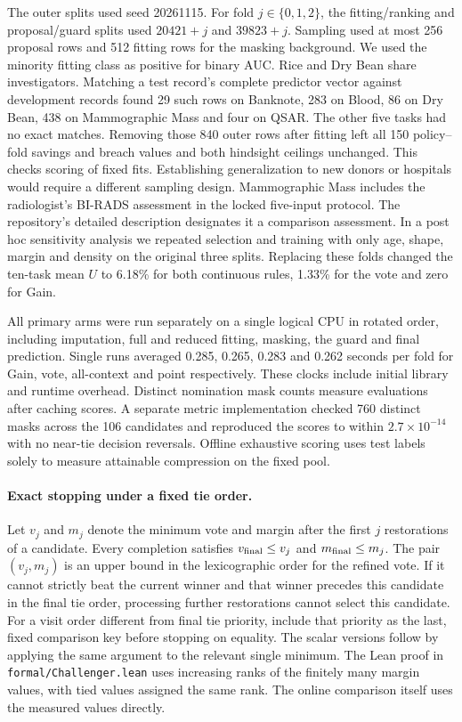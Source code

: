 The outer splits used seed 20261115. For fold $j\in\{0,1,2\}$, the fitting/ranking and proposal/guard splits used $20421+j$ and $39823+j$. Sampling used at most 256 proposal rows and 512 fitting rows for the masking background. We used the minority fitting class as positive for binary AUC. Rice and Dry Bean share investigators. Matching a test record's complete predictor vector against development records found 29 such rows on Banknote, 283 on Blood, 86 on Dry Bean, 438 on Mammographic Mass and four on QSAR. The other five tasks had no exact matches. Removing those 840 outer rows after fitting left all 150 policy--fold savings and breach values and both hindsight ceilings unchanged. This checks scoring of fixed fits. Establishing generalization to new donors or hospitals would require a different sampling design. Mammographic Mass includes the radiologist's BI-RADS assessment in the locked five-input protocol. The repository's detailed description designates it a comparison assessment. In a post hoc sensitivity analysis we repeated selection and training with only age, shape, margin and density on the original three splits. Replacing these folds changed the ten-task mean $U$ to 6.18\% for both continuous rules, 1.33\% for the vote and zero for Gain.

All primary arms were run separately on a single logical CPU in rotated order, including imputation, full and reduced fitting, masking, the guard and final prediction. Single runs averaged 0.285, 0.265, 0.283 and 0.262 seconds per fold for Gain, vote, all-context and point respectively. These clocks include initial library and runtime overhead. Distinct nomination mask counts measure evaluations after caching scores. A separate metric implementation checked 760 distinct masks across the 106 candidates and reproduced the scores to within $2.7\times10^{-14}$ with no near-tie decision reversals. Offline exhaustive scoring uses test labels solely to measure attainable compression on the fixed pool.

\paragraph{Exact stopping under a fixed tie order.}
Let $v_j$ and $m_j$ denote the minimum vote and margin after the first $j$ restorations of a candidate. Every completion satisfies $v_{\rm final}\le v_j$ and $m_{\rm final}\le m_j$. The pair $(v_j,m_j)$ is an upper bound in the lexicographic order for the refined vote. If it cannot strictly beat the current winner and that winner precedes this candidate in the final tie order, processing further restorations cannot select this candidate. For a visit order different from final tie priority, include that priority as the last, fixed comparison key before stopping on equality. The scalar versions follow by applying the same argument to the relevant single minimum. The Lean proof in \texttt{formal/Challenger.lean} uses increasing ranks of the finitely many margin values, with tied values assigned the same rank. The online comparison itself uses the measured values directly.

